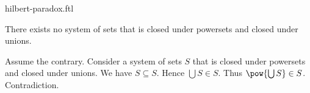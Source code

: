\documentclass{article}
\begin{document}
\begin{smodule}{hilbert-paradox.ftl}

  \begin{ftheorem*}[label=hilbert_paradox,title=Hilbert's Paradox]
    There exists no system of sets that is closed under powersets and closed under unions.
  \end{ftheorem*}
  \begin{fproof}[method=contradiction]
    Assume the contrary.
    Consider a system of sets $S$ that is closed under powersets and closed under unions.
    We have $S \subseteq S$.
    Hence $\bigcup S \in S$.
    Thus $\pow{\bigcup S} \in S$.
    Contradiction.
  \end{fproof}
\end{smodule}
\end{document}
